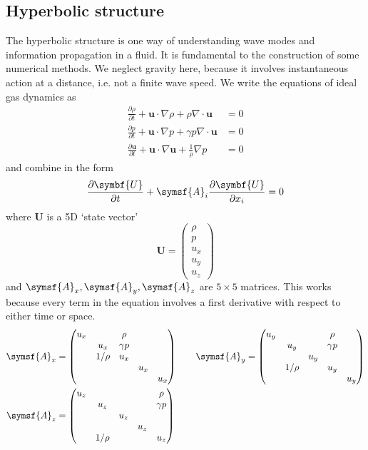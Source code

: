 \documentclass{jknotes}
\renewcommand{\u}{\symbf{u}}
\begin{document}
\subsection{Hyperbolic structure}
The hyperbolic structure is one way of understanding wave modes and
information propagation in a fluid. It is fundamental to the construction of
some numerical methods. We neglect gravity here, because it involves
instantaneous action at a distance, i.e. not a finite wave speed. We write the
equations of ideal gas dynamics as
\begin{align}
	\frac{\partial \rho}{\partial t} + \u \cdot \nabla \rho + \rho \nabla
	\cdot \u &= 0 \\
	\frac{\partial p}{\partial t} + \u \cdot \nabla p + \gamma p \nabla
	\cdot \u &= 0 \\
	\frac{\partial \u}{\partial t} + \u \cdot \nabla \u + \frac{1}{\rho}
	\nabla p &= 0
\end{align}
and combine in the form
\begin{equation}
	\frac{\partial \symbf{U}}{\partial t} + \symsf{A}_i \frac{\partial
	\symbf{U}}{\partial x_i} = 0 
\end{equation}
where $\symbf{U}$ is a 5D `state vector'
\begin{equation}
	\symbf{U} = \begin{pmatrix} \rho \\ p \\ u_x \\ u_y \\ u_z \end{pmatrix}
\end{equation}
and $\symsf{A}_x, \symsf{A}_y, \symsf{A}_z$ are $5\times 5$ matrices. This works because every term in
the equation involves a first derivative with respect to either time or space.
\begin{align}
	\symsf{A}_x &= \begin{pmatrix} u_x & & \rho & & \\ & u_x & \gamma p & & \\ &
		1/\rho & u_x & & \\ & & &u_x& \\ &&&& u_x
	\end{pmatrix} \hspace{2em}
		\symsf{A}_y = \begin{pmatrix} u_y & & &\rho  & \\ & u_y & &\gamma p & \\ &
	 & u_y & & \\ &1/\rho & &u_y& \\ &&&& u_y
	\end{pmatrix} \\
			\symsf{A}_z &= \begin{pmatrix} u_z & & &&\rho \\ & u_z & & &\gamma p \\ &
	 & u_z & & \\ & & &u_z& \\ &1/\rho&&& u_z
	\end{pmatrix}
\end{align}
\end{document}
